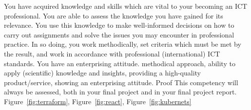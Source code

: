 \competentie
{%
	\competentieformulier
	{%
		You have acquired knowledge and skills which are vital to your becoming an ICT professional. You are able to assess the knowledge you have gained for its relevance. You use this knowledge to make well-informed decisions on how to carry out assignments and solve the issues you may encounter in professional practice. In so doing, you work methodically, set criteria which must be met by the result, and work in accordance with professional (international) ICT standards. You have an enterprising attitude.
	}
	{%
		methodical approach,%
		ability to apply (scientific) knowledge and insights,%
		providing a high-quality product/service,%
		showing an enterprising attitude.%
	}
	{%
		Proof
	}
	{%
		This competency will always be assessed, both in your final project and in your final project report.
	}
	{%
		Figure~\ref{fig:terraform},
		Figure~\ref{fig:react},
		Figure~\ref{fig:kubernets}
	}
}
